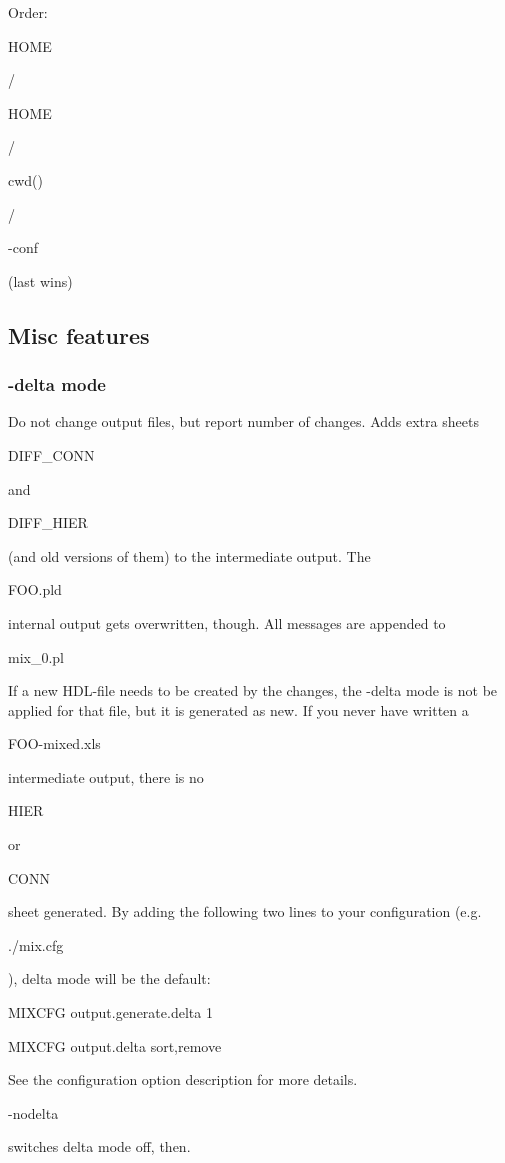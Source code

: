 \documentclass[a4paper,12pt]{article}
\begin{document}
Order: \begin{tt}HOME\end{tt} / \begin{tt}HOME\end{tt} / \begin{tt}cwd()\end{tt} / \begin{tt}-conf\end{tt} (last wins)

\subsection{Misc features}

\subsubsection{-delta mode}
Do not change output files, but report number of changes. Adds extra sheets \begin{tt}DIFF\_CONN\end{tt} and \begin{tt}DIFF\_HIER\end{tt} (and old versions of them) to the intermediate output. The \begin{tt}FOO.pld\end{tt} internal output gets overwritten, though. All messages are appended to \begin{tt}mix\_0.pl\end{tt}\newline
If a new HDL-file needs to be created by the changes, the -delta mode is not be applied for that file, but it is generated as new. If you never have written a \begin{tt}FOO-mixed.xls\end{tt} intermediate output, there is no \begin{tt}HIER\end{tt} or \begin{tt}CONN\end{tt} sheet generated.\newline
By adding the following two lines to your configuration (e.g. \begin{tt}./mix.cfg\end{tt}), delta mode will be the default:\newline
\newline
\begin{tt}MIXCFG output.generate.delta 1\end{tt}\newline
\begin{tt}MIXCFG output.delta sort,remove\end{tt}\newline
\newline
See the configuration option description for more details.\newline
\newline
\hspace*{10mm}\begin{tt}-nodelta\end{tt} switches delta mode off, then.\newline
\end{document}
